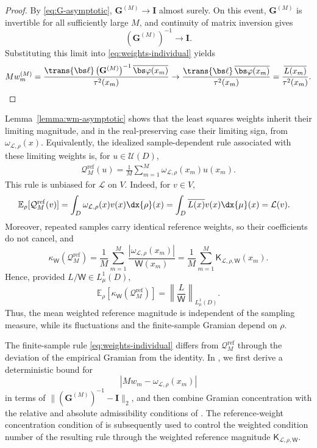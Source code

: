 \documentclass[10pt,dvipsnames]{amsart}
\begin{document}
\begin{proof}
By \eqref{eq:G-asymptotic},  $\mathbf G^{(M)}\to\mathbf I$ almost surely. On
this event, \(\mathbf G^{(M)}\) is invertible for all sufficiently large
\(M\), and continuity of matrix inversion gives
\[
    \left(\mathbf G^{(M)}\right)^{-1}\to\mathbf I.
\]
Substituting this limit into \eqref{eq:weights-individual} yields
\[
    M w_m^{(M)}
    =
    \frac{
    \trans{\bs\ell}
    \left(\mathbf G^{(M)}\right)^{-1}
    \overline{\bs\varphi(x_m)}
    }
    {\tau^2(x_m)}
    \to
    \frac{\trans{\bs\ell}\,\overline{\bs\varphi(x_m)}}{\tau^2(x_m)}
    =
    \frac{\overline{L(x_m)}}{\tau^2(x_m)}.
\]
\end{proof}

Lemma~\ref{lemma:wm-asymptotic} shows that the least squares weights inherit
their limiting magnitude, and in the real-preserving case their limiting
sign, from \(\omega_{\mathcal L, \rho}(x)\).  Equivalently, the idealized
sample-dependent rule associated with these limiting weights is, for
\(u\in\mathcal U(D)\),
\begin{align}
    \label{eq:reference-weight-rule}
    \mathcal Q_M^{\mathrm{ref}}(u)
    =
    \frac{1}{M}\sum_{m=1}^M \omega_{\mathcal L, \rho}(x_m)u(x_m).
\end{align}
This rule is unbiased for \(\mathcal L\) on \(V\).  Indeed, for \(v\in V\),
\begin{align*}
    \mathbb E_\rho[\mathcal Q_M^{\mathrm{ref}}(v)]
    &=
    \int_D
    \omega_{\mathcal L, \rho}(x)v(x)
    \dx{\rho}(x)
    =
    \int_D \overline{L(x)}v(x)\dx{\mu}(x)
    =
    \mathcal L(v).
\end{align*}
Moreover, repeated samples carry identical reference weights, so their
coefficients do not cancel, and
\[
    \kappa_{\mathsf W}(\mathcal Q_M^{\mathrm{ref}})
    =
    \frac{1}{M}
    \sum_{m=1}^M
    \frac{
        |\omega_{\mathcal L,\rho}(x_m)|
    }{
        \mathsf W(x_m)
    }
    =
    \frac{1}{M}
    \sum_{m=1}^M
    \mathsf K_{\mathcal L,\rho,\mathsf W}(x_m).
\]
Hence, provided \(L/\mathsf W\in L^1_\mu(D)\),
\[
    \mathbb E_\rho\left[
        \kappa_{\mathsf W}(\mathcal Q_M^{\mathrm{ref}})
    \right]
    =
    \left\|
        \frac{L}{\mathsf W}
    \right\|_{L^1_\mu(D)}.
\]
Thus, the mean weighted reference magnitude is independent of the sampling
measure, while its fluctuations and the finite-sample Gramian depend on
\(\rho\).

The finite-sample rule \eqref{eq:weights-individual} differs from \(\mathcal Q_M^{\mathrm{ref}}\) through the deviation of the empirical Gramian from the identity. In , we first derive a deterministic bound for \[ \left| M w_m-\omega_{\mathcal L, \rho}(x_m) \right| \] in terms of \(\|(\mathbf G^{(M)})^{-1}-\mathbf I\|_2\), and then combine Gramian concentration with the relative and absolute admissibility conditions of . The reference-weight concentration condition of  is subsequently used to control the weighted condition number of the resulting rule through the weighted reference magnitude \(\mathsf K_{\mathcal L,\rho,\mathsf W}\).
\end{document}
